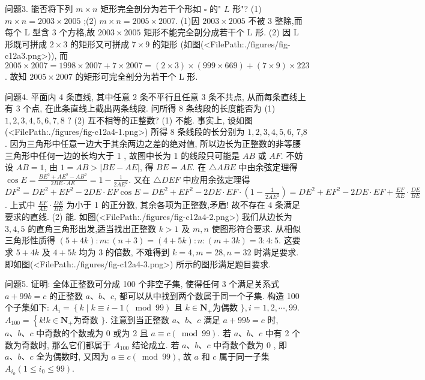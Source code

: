 问题3. 能否将下列 $m \times n$ 矩形完全剖分为若干个形如 $\square$ 的" $L$ 形"?
(1) $m \times n=2003 \times 2005$ ;(2) $m \times n=2005 \times 2007$.
(1)因 $2003 \times 2005$ 不被 3 整除,而每个 L 型含 3 个方格,故 $2003 \times 2005$ 矩形不能完全剖分成若干个 L 形.
(2) 因 L 形既可拼成 $2 \times 3$ 的矩形又可拼成 $7 \times 9$ 的矩形 (如图(<FilePath:./figures/fig-c12a3.png>)), 而 $2005 \times 2007=1998 \times 2007+ 7 \times 2007=(2 \times 3) \times(999 \times 669)+(7 \times 9) \times 223$. 故知 $2005 \times 2007$ 的矩形可完全剖分为若干个 $\mathrm{L}$ 形.



问题4. 平面内 4 条直线, 其中任意 2 条不平行且任意 3 条不共点, 从而每条直线上有 3 个点, 在此条直线上截出两条线段.
问所得 8 条线段的长度能否为
(1) $1,2,3,4,5,6,7,8$ ?
(2) 互不相等的正整数?
(1) 不能.
事实上, 设如图(<FilePath:./figures/fig-c12a4-1.png>) 所得 8 条线段的长分别为 $1,2,3,4,5,6$, 7,8 . 因为三角形中任意一边大于其余两边之差的绝对值, 所以边长为正整数的非等腰三角形中任何一边的长均大于 1 , 故图中长为 1 的线段只可能是 $A B$ 或 $A F$. 不妨设 $A B=1$, 由 $1=A B>|B E-A E|$, 得 $B E=A E$. 在 $\triangle A B E$ 中由余弦定理得 $\cos E=\frac{B E^2+A E^2-A B^2}{2 B E \cdot A E}=1-\frac{1}{2 A E^2}$. 又在 $\triangle D E F$ 中应用余弦定理得 $D F^2=D E^2+E F^2-2 D E \cdot E F \cos E=D E^2+E F^2-2 D E \cdot E F \cdot\left(1-\frac{1}{2 A E^2}\right)= D E^2+E F^2-2 D E \cdot E F+\frac{E F}{A E} \cdot \frac{D E}{B E}$. 上式中 $\frac{E F}{A E} \cdot \frac{D E}{B E}$ 为小于 1 的正分数, 其余各项为正整数,矛盾! 故不存在 4 条满足要求的直线.
(2) 能.
如图(<FilePath:./figures/fig-c12a4-2.png>) 我们从边长为 $3,4,5$ 的直角三角形出发,适当找出正整数 $k>1$ 及 $m, n$ 使图形符合要求.
从相似三角形性质得 $(5+4 k): m:(n+ 3)=(4+5 k): n:(m+3 k)=3: 4: 5$. 这要求 $5+4 k$ 及 $4+5 k$ 均为 3 的倍数, 不难得到 $k=4, m=28, n=32$ 时满足要求.
即如图(<FilePath:./figures/fig-c12a4-3.png>) 所示的图形满足题目要求.



问题5. 证明: 全体正整数可分成 100 个非空子集, 使得任何 3 个满足关系式 $a+ 99 b=c$ 的正整数 $a 、 b 、 c$, 都可以从中找到两个数属于同一个子集.
构造 100 个子集如下:
$A_i=\left\{k \mid k \equiv i-1(\bmod 99)\right.$ 且 $k \in \mathbf{N}_{+}$为偶数 $\}, i=1,2, \cdots, 99$.
$A_{100}=\left\{k ! k \in \mathbf{N}_{+}\right.$为奇数 $\}$.
注意到当正整数 $a 、 b 、 c$ 满足 $a+99 b=c$ 时, $a 、 b 、 c$ 中奇数的个数或为 0 或为 2 且 $a \equiv c(\bmod 99)$. 若 $a 、 b 、 c$ 中有 2 个数为奇数时, 那么它们都属于 $A_{100}$ 结论成立.
若 $a 、 b 、 c$ 中奇数个数为 0 , 即 $a 、 b 、 c$ 全为偶数时, 又因为 $a \equiv c(\bmod 99)$, 故 $a$ 和 $c$ 属于同一子集 $A_{i_0}\left(1 \leqslant i_0 \leqslant 99\right)$.



